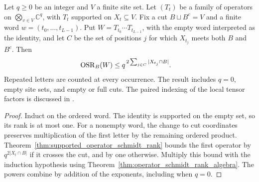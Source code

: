\begin{theorem}
    \label{thm:supported_word_schmidt_rank}
    \leanok
    Let $q\ge0$ be an integer and $V$ a finite site set. Let $(T_t)$ be a
    family of operators on $\bigotimes_{v\in V}\mathbb C^q$, with $T_t$
    supported on $X_t\subseteq V$. Fix a cut $B\sqcup B^c=V$ and a finite
    word $w=(t_0,\ldots,t_{L-1})$. Put $W=T_{t_0}\cdots T_{t_{L-1}}$,
    with the empty word interpreted as the identity, and let $C$ be the
    set of positions $j$ for which $X_{t_j}$ meets both $B$ and $B^c$.
    Then
    \begin{align}
        \operatorname{OSR}_B(W)
         & \le q^{\,2\sum_{j\in C}|X_{t_j}\cap B|}.\notag
    \end{align}
    Repeated letters are counted at every occurrence. The result includes
    $q=0$, empty site sets, and empty or full cuts. The paired indexing of
    the local tensor factors is discussed in
    \cite{gap:lvv13_paired_matrix_decomposition}.
\end{theorem}
\begin{proof}\leanok
    Induct on the ordered word. The identity is supported on the empty
    set, so its rank is at most one. For a nonempty word, the change to
    cut coordinates preserves multiplication of the first letter by the
    remaining ordered product.
    Theorem~\ref{thm:supported_operator_schmidt_rank} bounds the first operator by
    $q^{2|X_t\cap B|}$ if it crosses the cut, and by one otherwise.
    Multiply this bound with the induction hypothesis using
    Theorem~\ref{thm:operator_schmidt_rank_algebra}. The powers combine by
    addition of the exponents, including when $q=0$.
\end{proof}

